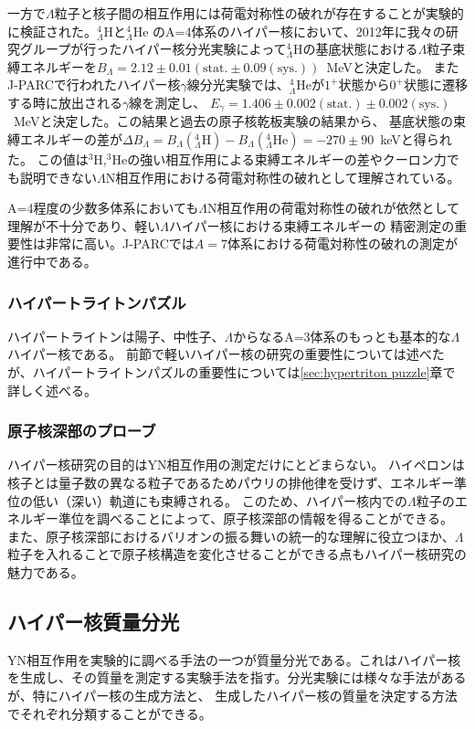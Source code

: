 \documentclass[a4paper,11pt,uplatex]{jsbook}
\begin{document}
一方で$\Lambda$粒子と核子間の相互作用には荷電対称性の破れが存在することが実験的に検証された。$^4_\Lambda \text{H}$と$^4_\Lambda \text{He}$
のA=4体系のハイパー核において、2012年に我々の研究グループが行ったハイパー核分光実験によって$^4_\Lambda \text{H}$の基底状態における$\Lambda$粒子束縛エネルギーを$B_\Lambda = 2.12 \pm 0.01 (\text{stat.} \pm 0.09 (\text{sys.}))$~MeVと決定した\cite{esserObservation4Hyperhydrogen2015,NagaoD}。
またJ-PARCで行われたハイパー核$\gamma$線分光実験では、$^4_\Lambda \text{He}$が$1^+$状態から$0^+$状態に遷移する時に放出される$\gamma$線を測定し、
$E_\gamma = 1.406 \pm 0.002(\text{stat.}) \pm 0.002 (\text{sys.})$~MeVと決定した\cite{yamamoto2015}。この結果と過去の原子核乾板実験の結果から、
基底状態の束縛エネルギーの差が$\Delta B_\Lambda = B_\Lambda(^4_\Lambda\text{H}) - B_\Lambda(^4_\Lambda\text{He}) = -270 \pm 90$~keVと得られた。
この値は$^3\text{H}$,$^3\text{He}$の強い相互作用による束縛エネルギーの差やクーロン力でも説明できない$\Lambda$N相互作用における荷電対称性の破れとして理解されている。

A=4程度の少数多体系においても$\Lambda$N相互作用の荷電対称性の破れが依然として理解が不十分であり、軽い$\Lambda$ハイパー核における束縛エネルギーの
精密測定の重要性は非常に高い。J-PARCでは$A=7$体系における荷電対称性の破れの測定が進行中である。
\subsubsection{ハイパートライトンパズル}
ハイパートライトンは陽子、中性子、$\Lambda$からなるA=3体系のもっとも基本的な$\Lambda$ハイパー核である。
前節で軽いハイパー核の研究の重要性については述べたが、ハイパートライトンパズルの重要性については\ref{sec:hypertriton puzzle}章で詳しく述べる。
\subsubsection{原子核深部のプローブ}
ハイパー核研究の目的はYN相互作用の測定だけにとどまらない。
ハイペロンは核子とは量子数の異なる粒子であるためパウリの排他律を受けず、エネルギー準位の低い（深い）軌道にも束縛される。
このため、ハイパー核内での$\Lambda$粒子のエネルギー準位を調べることによって、原子核深部の情報を得ることができる。
また、原子核深部におけるバリオンの振る舞いの統一的な理解に役立つほか、$\Lambda$粒子を入れることで原子核構造を変化させることができる点もハイパー核研究の魅力である。

\subsection{ハイパー核質量分光}
YN相互作用を実験的に調べる手法の一つが質量分光である。これはハイパー核を生成し、その質量を測定する実験手法を指す。分光実験には様々な手法があるが、特にハイパー核の生成方法と、
生成したハイパー核の質量を決定する方法でそれぞれ分類することができる。
\end{document}
